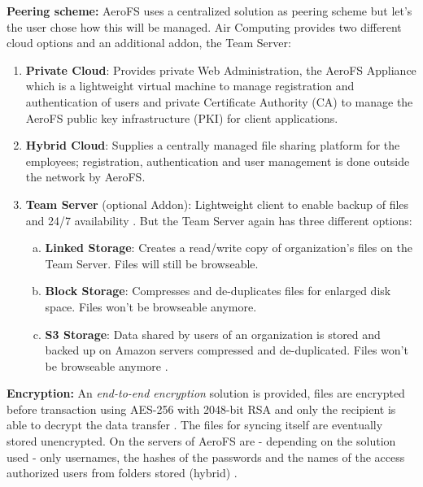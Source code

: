 \textbf{Peering scheme:} AeroFS uses a centralized solution as peering scheme but let's the user chose how this will be managed. Air Computing provides two different cloud options and an additional addon, the Team Server:

\begin{enumerate}
\item \textbf{Private Cloud}: Provides private Web Administration, the AeroFS Appliance which is a lightweight virtual machine to manage registration and authentication of users and private Certificate Authority (CA) to manage the AeroFS public key infrastructure (PKI) for client applications.
\item \textbf{Hybrid Cloud}: Supplies a centrally managed file sharing platform for the employees; registration, authentication and user management is done outside the network by AeroFS.
\item \textbf{Team Server} (optional Addon): Lightweight client to enable backup of files and 24/7 availability \cite{aerofs:cloud_types}. But the Team Server again has three different options:
	\begin{enumerate}[(a)]
	\item \textbf{Linked Storage}: Creates a read/write copy of organization's files on the Team Server. Files will still be browseable.
	\item \textbf{Block Storage}: Compresses and de-duplicates files for enlarged disk space. Files won't be browseable anymore.
	\item \textbf{S3 Storage}: Data shared by users of an organization is stored and backed up on Amazon servers compressed and de-duplicated. Files won't be browseable anymore \cite{aerofs:storage_types}.
	\end{enumerate}
\end{enumerate}

\textbf{Encryption:} An \textit{end-to-end encryption} solution is provided, files are encrypted before transaction using AES-256 with 2048-bit RSA and only the recipient is able to decrypt the data transfer \cite{aerofs:security}. The files for syncing itself are eventually stored unencrypted. On the servers of AeroFS are - depending on the solution used - only usernames, the hashes of the passwords and the names of the access authorized users from folders stored (hybrid) \cite{aerofs:security_2}.

